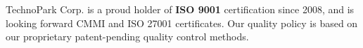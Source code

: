 
TechnoPark Corp. is a proud holder of \textbf{ISO 9001} certification since 2008, 
and is looking forward CMMI and ISO 27001 certificates. Our quality policy
is based on our proprietary patent-pending quality control methods.
